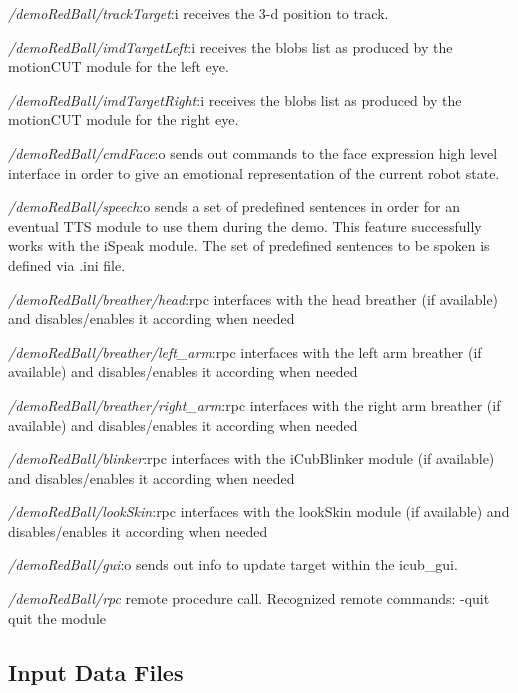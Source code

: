 \begin{DoxyItemize}
\item {\itshape /demo\+Red\+Ball/track\+Target}\+:i receives the 3-\/d position to track.
\item {\itshape /demo\+Red\+Ball/imd\+Target\+Left}\+:i receives the blobs list as produced by the motion\+C\+UT module for the left eye.
\item {\itshape /demo\+Red\+Ball/imd\+Target\+Right}\+:i receives the blobs list as produced by the motion\+C\+UT module for the right eye.
\item {\itshape /demo\+Red\+Ball/cmd\+Face}\+:o sends out commands to the face expression high level interface in order to give an emotional representation of the current robot state.
\item {\itshape /demo\+Red\+Ball/speech}\+:o sends a set of predefined sentences in order for an eventual T\+TS module to use them during the demo. This feature successfully works with the i\+Speak module. The set of predefined sentences to be spoken is defined via .ini file.
\item {\itshape /demo\+Red\+Ball/breather/head}\+:rpc interfaces with the head breather (if available) and disables/enables it according when needed
\item {\itshape /demo\+Red\+Ball/breather/left\+\_\+arm}\+:rpc interfaces with the left arm breather (if available) and disables/enables it according when needed
\item {\itshape /demo\+Red\+Ball/breather/right\+\_\+arm}\+:rpc interfaces with the right arm breather (if available) and disables/enables it according when needed
\item {\itshape /demo\+Red\+Ball/blinker}\+:rpc interfaces with the i\+Cub\+Blinker module (if available) and disables/enables it according when needed
\item {\itshape /demo\+Red\+Ball/look\+Skin}\+:rpc interfaces with the look\+Skin module (if available) and disables/enables it according when needed
\item {\itshape /demo\+Red\+Ball/gui}\+:o sends out info to update target within the icub\+\_\+gui.
\item {\itshape /demo\+Red\+Ball/rpc} remote procedure call. Recognized remote commands\+: -\/\textquotesingle{}quit\textquotesingle{} quit the module
\end{DoxyItemize}\hypertarget{group__icub__pf3dTracker_in_files_sec}{}\subsection{Input Data Files}\label{group__icub__pf3dTracker_in_files_sec}
